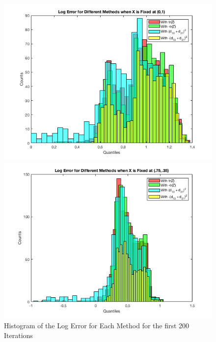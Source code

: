 \documentclass[answers]{exam}
\begin{document}
    
    
    
    \begin{figure}[H]
    \centering
    \caption{Histogram of the Log Error for Each Method for the first 200 Iterations}
    \begin{minipage}{.5\textwidth}
        \centering
        \includegraphics[width=1.1\textwidth, height=0.25\textheight]{Problem8hc.png}
    \end{minipage}%
    \begin{minipage}{0.5\textwidth}
        \centering
        \includegraphics[width=1.1\textwidth, height=0.25\textheight]{Problem8hv.png}
    \end{minipage}
    \label{phist}
\end{figure}
    
\end{document}
